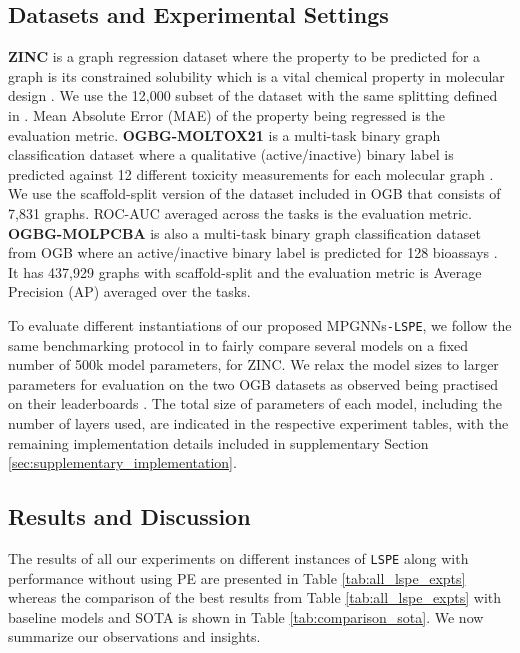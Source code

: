 \documentclass{article} \usepackage{iclr2021_conference,times}
\begin{document}
\subsection{Datasets and Experimental Settings}
\label{sec:experiments_datasets_and_settings}
\textbf{ZINC} is a graph regression dataset where the property to be predicted for a graph is its constrained solubility which is a vital chemical property in molecular design \citep{jin2018junction}. We use the 12,000 subset of the dataset with the same splitting defined in \cite{dwivedi2020benchmarking}. Mean Absolute Error (MAE) of the property being regressed is the evaluation metric. 
\textbf{OGBG-MOLTOX21} is a multi-task binary graph classification dataset where a qualitative (active/inactive) binary label is predicted against 12 different toxicity measurements for each molecular graph \citep{tox, wu2018moleculenet}. We use the scaffold-split version of the dataset included in OGB \citep{hu2020ogb} that consists of 7,831 graphs. ROC-AUC averaged across the tasks is the evaluation metric.
\textbf{OGBG-MOLPCBA} is also a multi-task binary graph classification dataset from OGB where an active/inactive binary label is predicted for 128 bioassays \citep{wang2012pubchem, wu2018moleculenet}. It has 437,929 graphs with scaffold-split and the evaluation metric is Average Precision (AP) averaged over the tasks.

To evaluate different instantiations of our proposed MPGNNs\texttt{-LSPE}, we follow the same benchmarking protocol in \cite{dwivedi2020benchmarking} to fairly compare several models on a fixed number of 500k model parameters, for ZINC. We relax the model sizes to larger parameters for evaluation on the two OGB datasets as observed being practised on their leaderboards \citep{hu2020ogb}. The total size of parameters of each model, including the number of layers used, are indicated in the respective 
experiment
tables, with the remaining implementation details 
included in supplementary Section \ref{sec:supplementary_implementation}.

\subsection{Results and Discussion}
\label{sec:experiments_results}


The results of all our experiments on different instances of \texttt{LSPE} along with performance without using PE are presented in Table \ref{tab:all_lspe_expts} whereas the comparison of the best results from Table \ref{tab:all_lspe_expts} with baseline models and SOTA is shown in Table \ref{tab:comparison_sota}. We now summarize our observations and insights.
\end{document}
